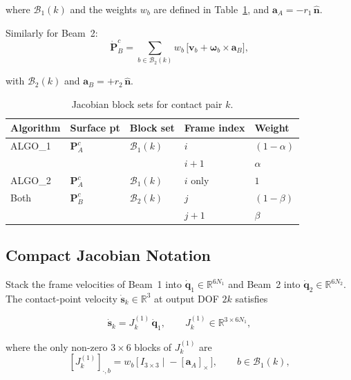 \documentclass[11pt, a4paper]{article}
\newcommand{\vv}[1]{\bm{#1}}
\newcommand{\nn}{\hat{\vv{n}}}
\begin{document}
where $\mathcal{B}_1(k)$ and the weights $w_b$ are defined in
Table~\ref{tab:blocks}, and $\vv{a}_A = -r_1\,\nn$.

Similarly for Beam~2:
\begin{equation}
  \boxed{
  \dot{\vv{P}}^c_B
  = \sum_{b \in \mathcal{B}_2(k)}
    w_b\,\bigl[\vv{v}_b + \bm{\omega}_b \times \vv{a}_B\bigr],
  }
  \label{eq:PcBdot}
\end{equation}

with $\mathcal{B}_2(k)$ and $\vv{a}_B = +r_2\,\nn$.

\begin{table}[h]
\centering
\caption{Jacobian block sets for contact pair $k$.}
\label{tab:blocks}
\begin{tabular}{lllll}
\toprule
Algorithm & Surface pt & Block set & Frame index & Weight \\
\midrule
ALGO\_1 & $\vv{P}^c_A$ & $\mathcal{B}_1(k)$ & $i$   & $(1-\alpha)$ \\
        &               &                     & $i+1$ & $\alpha$ \\
\addlinespace
ALGO\_2 & $\vv{P}^c_A$ & $\mathcal{B}_1(k)$ & $i$ only & $1$ \\
\midrule
Both    & $\vv{P}^c_B$ & $\mathcal{B}_2(k)$ & $j$   & $(1-\beta)$ \\
        &               &                     & $j+1$ & $\beta$ \\
\bottomrule
\end{tabular}
\end{table}

\subsection{Compact Jacobian Notation}

Stack the frame velocities of Beam~1 into $\dot{\vv{q}}_1 \in \mathbb{R}^{6N_1}$
and Beam~2 into $\dot{\vv{q}}_2 \in \mathbb{R}^{6N_2}$.
The contact-point velocity $\dot{\vv{s}}_k \in \mathbb{R}^3$ at output DOF $2k$
satisfies

\begin{equation}
  \dot{\vv{s}}_k = J^{(1)}_k\,\dot{\vv{q}}_1,
  \qquad
  J^{(1)}_k \in \mathbb{R}^{3 \times 6N_1},
  \label{eq:J1}
\end{equation}

where the only non-zero $3\times 6$ blocks of $J^{(1)}_k$ are
\begin{equation}
  \left[J^{(1)}_k\right]_{\cdot,b}
  = w_b\,\bigl[\,I_{3\times 3}\;\Big|\; -[\vv{a}_A]_\times\,\bigr],
  \qquad b \in \mathcal{B}_1(k),
  \label{eq:Jblock1}
\end{equation}
\end{document}

